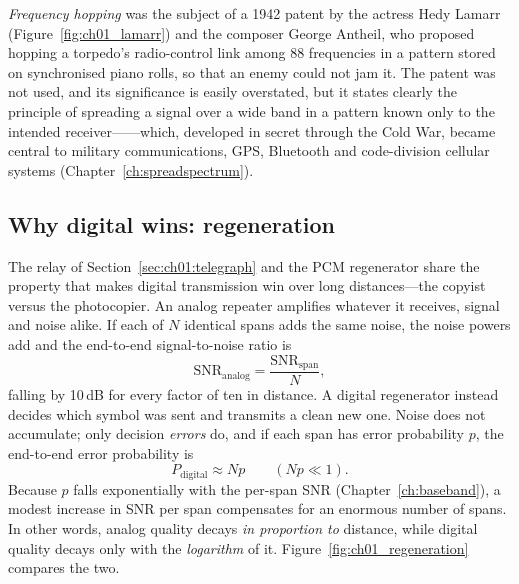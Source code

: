 \emph{Frequency hopping} was the subject of a 1942 patent by the actress Hedy Lamarr
(Figure~\ref{fig:ch01_lamarr}) and the composer
George Antheil, who proposed hopping a torpedo's radio-control link among 88 frequencies in a pattern
stored on synchronised piano rolls, so that an enemy could not jam it. The patent was not used, and its
significance is easily overstated, but it states clearly the principle of spreading a signal over a wide
band in a pattern known only to the intended receiver------which, developed in
secret through the Cold War, became central to military communications, GPS, Bluetooth and code-division
cellular systems (Chapter~\ref{ch:spreadspectrum}).


\subsection{Why digital wins: regeneration}

The relay of Section~\ref{sec:ch01:telegraph} and the PCM regenerator share the property that makes
digital transmission win over long distances---the copyist versus the photocopier. An analog repeater
amplifies whatever it receives, signal and noise alike. If each of $N$ identical spans adds the same
noise, the noise powers add and the end-to-end signal-to-noise ratio is
\begin{equation}
\mathrm{SNR}_{\text{analog}} = \frac{\mathrm{SNR}_{\text{span}}}{N},
\label{eq:ch01:analogcascade}
\end{equation}
falling by 10\,dB for every factor of ten in distance. A digital regenerator instead decides which
symbol was sent and transmits a clean new one. Noise does not accumulate; only decision \emph{errors}
do, and if each span has error probability $p$, the end-to-end error probability is
\begin{equation}
P_{\text{digital}} \approx Np \qquad (Np\ll1).
\label{eq:ch01:digitalcascade}
\end{equation}
Because $p$ falls exponentially with the per-span SNR (Chapter~\ref{ch:baseband}), a modest increase in
SNR per span compensates for an enormous number of spans. In other words, analog quality decays
\emph{in proportion to} distance, while digital quality decays only with the \emph{logarithm} of it.
Figure~\ref{fig:ch01_regeneration} compares the two.



